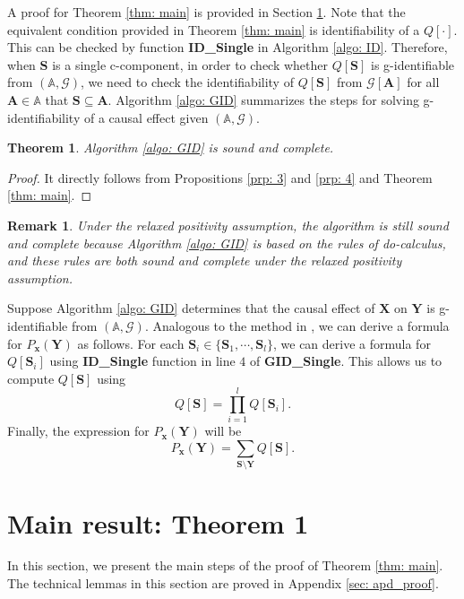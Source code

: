 \documentclass[accepted]{uai2022}
\newtheorem{theorem}{Theorem}%
\newtheorem{remark}{Remark}
\newcommand{\X}[0]{\mathbf{X}}
\newcommand{\Y}[0]{\mathbf{Y}}
\newcommand{\A}[0]{\mathbf{A}}
\newcommand{\x}[0]{\mathbf{x}}
\newcommand{\G}[0]{\mathcal{G}}
\begin{document}
    A proof for Theorem \ref{thm: main} is provided in Section \ref{sec: main}.
    Note that the equivalent condition provided in Theorem \ref{thm: main} is identifiability of a $Q[\cdot]$. This can be checked by function \textbf{ID\_Single} in Algorithm \ref{algo: ID}. 
    Therefore, when $\textbf{S}$ is a single c-component, in order to check whether $Q[\mathbf{S}]$ is g-identifiable from $(\mathbb{A}, \G)$, we need to check the identifiability of $Q[\mathbf{S}]$ from $\G[\A]$ for all $\A\in \mathbb{A}$ that $\mathbf{S}\subseteq \A$. 
    Algorithm \ref{algo: GID} summarizes the steps for solving g-identifiability of a causal effect given $(\mathbb{A}, \G)$.
    \begin{theorem}
        Algorithm \ref{algo: GID} is sound and complete. 
    \end{theorem}
    \begin{proof}
        It directly follows from Propositions \ref{prp: 3} and \ref{prp: 4} and Theorem \ref{thm: main}.
    \end{proof}
    \begin{remark}
        Under the relaxed positivity assumption, the algorithm is still sound and complete because Algorithm \ref{algo: GID} is based on the rules of do-calculus, and these rules are both sound and complete under the relaxed positivity assumption.
    \end{remark}
    Suppose Algorithm \ref{algo: GID} determines that the causal effect of $\X$ on $\Y$ is g-identifiable from $(\mathbb{A}, \G)$. 
    Analogous to the method in \cite{tian2003ID}, we can derive a formula for $P_{\x}(\Y)$ as follows.
    For each $\mathbf{S}_i \in \{\mathbf{S}_1,\cdots,\mathbf{S}_l\}$, we can derive a formula for $Q[\mathbf{S}_i]$ using \textbf{ID\_Single} function in line $4$ of \textbf{GID\_Single}. 
    This allows us to compute $Q[\mathbf{S}]$ using 
    \begin{equation*}
        Q[\mathbf{S}] = \prod_{i=1}^l Q[\mathbf{S}_i].
    \end{equation*}
    Finally, the expression for $P_{\x}(\Y)$ will be
    \begin{equation*}
        P_{\x}(\Y) = \sum_{\mathbf{S}\setminus \Y} Q[\mathbf{S}].
    \end{equation*}

\section{Main result: Theorem 1} \label{sec: main}
    In this section, we present the main steps of the proof of Theorem \ref{thm: main}.
    The technical lemmas in this section are proved in Appendix \ref{sec: apd_proof}. 
\end{document}
